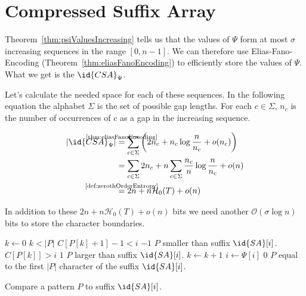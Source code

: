 \section{Compressed Suffix Array}

Theorem~\ref{thm:psiValuesIncreasing} tells us that the values of $\Psi$ form at most $\sigma$ increasing sequences in the range $[0,n-1]$. We can therefore use Elias-Fano-Encoding (Theorem~\ref{thm:eliasFanoEncoding}) to efficiently store the values of $\Psi$. What we get is the  $\id{CSA}_\Psi$.

Let's calculate the needed space for each of these sequences. In the following equation the alphabet $\Sigma$ is the set of possible gap lengths. For each $c \in \Sigma$, $n_c$ is the number of occurrences of $c$ as a gap in the increasing sequence.

\begin{align}
  \begin{aligned}
    \vert \id{CSA}_\Psi \vert
    &\stackrel{\mathclap{\text{\ref{thm:eliasFanoEncoding}}}}{=}
    \sum_{c \in \Sigma} \left(2n_c + n_c\log\frac{n}{n_c} + o(n_c)\right) \\
    &= \sum_{c \in \Sigma} 2n_c + n\sum_{c \in \Sigma}\frac{n_c}{n}\log\frac{n}{n_c} + o(n) \\
    &\stackrel{\mathclap{\text{\ref{def:zerothOrderEntropy}}}}{=} 2n + n\mathcal{H}_0(T) + o(n)
  \end{aligned}
\end{align}

In addition to these $2n + n\mathcal{H}_0(T) + o(n)$ bits we need another $\mathcal{O}(\sigma\log n)$ bits to store the character boundaries.

\begin{algorithm}[htb]
  \begin{codebox}
    \li $k \gets 0$
    \li \While $k < \vert P \vert$
        \Do
    \li   \If $C[P[k] + 1] - 1 < i$
          \label{line:compareCSACheckSmaller}
          \Then
    \li     \Return $-1$ \>\>\>\>\Comment $P$ smaller than suffix $\id{SA}[i]$.
    \li   \ElseIf $C[P[k]] > i$
          \label{line:compareCSACheckBigger}
          \Then
    \li     \Return $1$ \>\>\>\>\Comment $P$ larger than suffix $\id{SA}[i]$.
          \End
    \li   $k \gets k + 1$
    \li   $i \gets \Psi[i]$
        \End
    \li \Return $0$ \>\>\>\>\>\>\Comment $P$ equal to the first $\vert P \vert$ character of the suffix $\id{SA}[i]$.
  \end{codebox}
  \caption{Compare a pattern $P$ to suffix $\id{SA}[i]$.}
  \label{alg:compareCompressedSuffixArrayPsi}
\end{algorithm}

